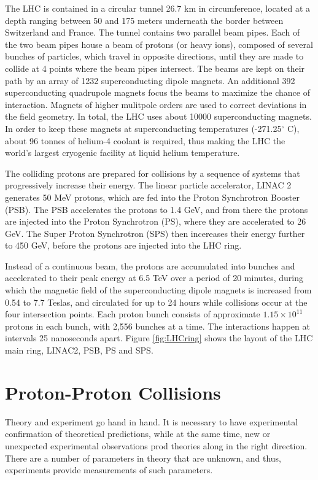 \documentclass[11pt,a4paper,openright,twoside]{report}
\begin{document}
The LHC is contained in a circular tunnel 26.7 km in circumference, located at a depth ranging between 50 and 175 meters underneath the border between Switzerland and France. The tunnel contains two parallel beam pipes. Each of the two beam pipes house a beam of protons (or heavy ions), composed of several bunches of particles, which travel in opposite directions, until they are made to collide at 4 points where the beam pipes intersect. The beams are kept on their path by an array of 1232 superconducting dipole magnets. An additional 392 superconducting quadrupole magnets focus the beams to maximize the chance of interaction. Magnets of higher mulitpole orders are used to correct deviations in the field geometry. In total, the LHC uses about 10000 superconducting magnets. In order to keep these magnets at superconducting temperatures (-271.25$^\circ$ C), about 96 tonnes of helium-4 coolant is required, thus making the LHC the world's largest cryogenic facility at liquid helium temperature.

The colliding protons are prepared for collisions by a sequence of systems that progressively increase their energy. The linear particle accelerator, LINAC 2 generates 50 MeV protons, which are fed into the Proton Synchrotron Booster (PSB). The PSB accelerates the protons to 1.4 GeV, and from there the protons are injected into the Proton Synchrotron (PS), where they are accelerated to 26 GeV. The Super Proton Synchrotron (SPS) then incereases their energy further to 450 GeV, before the protons are injected into the LHC ring. 

Instead of a continuous beam, the protons are accumulated into bunches and accelerated to their peak energy at 6.5 TeV over a period of 20 minutes, during which the magnetic field of the superconducting dipole magnets is increased from 0.54 to 7.7 Teslas, and circulated for up to 24 hours while collisions occur at the four intersection points. Each proton bunch consists of approximate $1.15\times 10^{11}$ protons in each bunch, with 2,556 bunches \cite{bunch} at a time. The interactions happen at intervals 25 nanoseconds apart. Figure \ref{fig:LHCring} shows the layout of the LHC main ring, LINAC2, PSB, PS and SPS.

\section{Proton-Proton Collisions}
Theory and experiment go hand in hand. It is necessary to have experimental confirmation of theoretical predictions, while at the same time, new or unexpected experimental observations prod theories along in the right direction. There are a number of parameters in theory that are unknown, and thus, experiments provide measurements of such parameters. 
\end{document}
